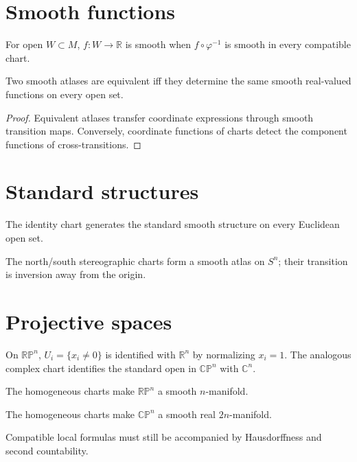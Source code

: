 \section{Smooth functions}
\begin{definition}\label{def:vii02-smooth-function}
For open \(W\subset M\), \(f:W\to\mathbb R\) is smooth when \(f\circ\varphi^{-1}\) is smooth in every compatible chart.
\end{definition}
\begin{theorem}\label{thm:vii02-functions-equivalence}
Two smooth atlases are equivalent iff they determine the same smooth real-valued functions on every open set.
\end{theorem}
\begin{proof}
Equivalent atlases transfer coordinate expressions through smooth transition maps. Conversely, coordinate functions of charts detect the component functions of cross-transitions.
\end{proof}

\section{Standard structures}
\begin{example}\label{ex:vii02-euclidean}
The identity chart generates the standard smooth structure on every Euclidean open set.
\end{example}
\begin{example}\label{ex:vii02-sphere}
The north/south stereographic charts form a smooth atlas on \(S^n\); their transition is inversion away from the origin.
\end{example}

\section{Projective spaces}
\begin{definition}\label{def:vii02-projective-charts}
On \(\mathbb{RP}^n\), \(U_i=\{x_i\neq0\}\) is identified with \(\mathbb R^n\) by normalizing \(x_i=1\). The analogous complex chart identifies the standard open in \(\mathbb{CP}^n\) with \(\mathbb C^n\).
\end{definition}
\begin{theorem}\label{thm:vii02-rp}
The homogeneous charts make \(\mathbb{RP}^n\) a smooth \(n\)-manifold.
\end{theorem}
\begin{theorem}\label{thm:vii02-cp}
The homogeneous charts make \(\mathbb{CP}^n\) a smooth real \(2n\)-manifold.
\end{theorem}
\begin{warning}\label{warning:vii02-pseudo-atlas}
Compatible local formulas must still be accompanied by Hausdorffness and second countability.
\end{warning}

